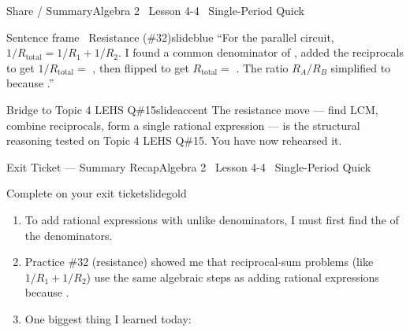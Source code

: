 \documentclass[aspectratio=169, 11pt]{beamer}
\begin{document}
\begin{frame}{Share / Summary}{Algebra 2 \textperiodcentered\ Lesson 4-4 \textperiodcentered\ Single-Period Quick}
\vspace{0.2cm}
\begin{projcard}{Sentence frame \textperiodcentered\ Resistance (\#32)}{slideblue}
``For the parallel circuit, \(1/R_{\text{total}} = 1/R_1 + 1/R_2\). I found a common denominator of \underline{\hspace{1cm}}, added the reciprocals to get \(1/R_{\text{total}} =\) \underline{\hspace{1.5cm}}, then flipped to get \(R_{\text{total}} =\) \underline{\hspace{1cm}}. The ratio \(R_A/R_B\) simplified to \underline{\hspace{1cm}} because \underline{\hspace{2cm}}.''
\end{projcard}

\vspace{0.15cm}
\begin{projcard}{Bridge to Topic 4 LEHS Q\#15}{slideaccent}
The resistance move --- find LCM, combine reciprocals, form a single rational expression --- is the structural reasoning tested on Topic 4 LEHS Q\#15. You have now rehearsed it.
\end{projcard}
\end{frame}

\begin{frame}{Exit Ticket --- Summary Recap}{Algebra 2 \textperiodcentered\ Lesson 4-4 \textperiodcentered\ Single-Period Quick}
\vspace{0.2cm}
\begin{projcard}{Complete on your exit ticket}{slidegold}
\begin{enumerate}
  \setlength{\itemsep}{0.25cm}
  \item To add rational expressions with unlike denominators, I must first find the \underline{\hspace{4cm}} of the denominators.
  \item Practice \#32 (resistance) showed me that reciprocal-sum problems (like \(1/R_1 + 1/R_2\)) use the same algebraic steps as adding rational expressions because \underline{\hspace{4cm}}.
  \item One biggest thing I learned today: \underline{\hspace{6cm}}
\end{enumerate}
\end{projcard}
\end{frame}
\end{document}
